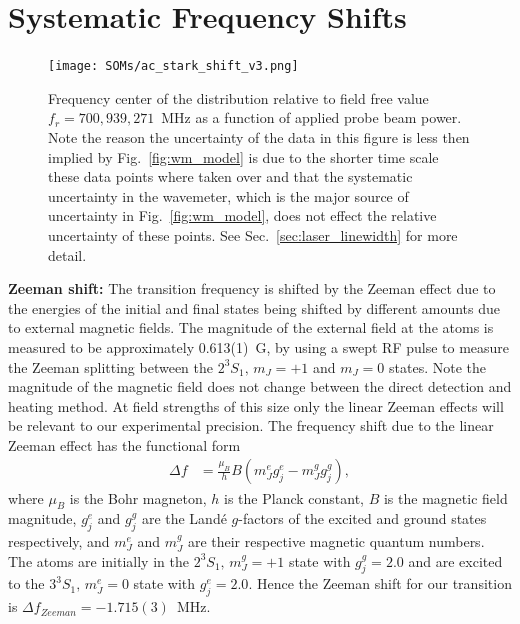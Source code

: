 \documentclass[%
 amsmath,amssymb,
aps,
]{revtex4-2}
\newcommand{\UpperState}{3^{3\!}S_1}%
\newcommand{\MetastableState}{2^{3\!}S_1}%
\begin{document}

\section{Systematic Frequency Shifts}
\label{sec:freq_shifts}
\begin{figure}
    \centering
    \texttt{[image: SOMs/ac\_stark\_shift\_v3.png]}
    \caption{Frequency center of the distribution relative to field free value \(f_r=700,939,271\)~MHz as a function of applied probe beam power. Note the reason the uncertainty of the data in this figure is less then implied by Fig.~\ref{fig:wm_model} is due to the shorter time scale these data points where taken over and that the systematic uncertainty in the wavemeter, which is the major source of uncertainty in Fig.~\ref{fig:wm_model}, does not effect the relative uncertainty of these points. See Sec.~\ref{sec:laser_linewidth} for more detail.}%
    \label{fig:ac_stark} %
\end{figure}
         \textbf{Zeeman shift:}
         The transition frequency is shifted by the Zeeman effect due to the energies of the initial and final states being shifted by different amounts due to external magnetic fields. The magnitude of the external field at the atoms is measured to be approximately 0.613(1)~G, by using a swept RF pulse to measure the Zeeman splitting between the \(\MetastableState, \,m_J=+1\) and \(m_J=0\) states. Note the magnitude of the magnetic field does not change between the direct detection and heating method. At field strengths of this size only the linear Zeeman effects will be relevant to our experimental precision. The frequency shift due to the linear Zeeman effect has the functional form 
         \begin{align}
             \Delta f &= \frac{\mu_B}{h} B (m_{J}^{e} g_{j}^{e} - m_{J}^{g} g_{j}^{g}),
         \end{align}
         where \(\mu_B\) is the Bohr magneton, \(h\) is the Planck constant, \(B\) is the magnetic field magnitude, \(g_{j}^{e}\) and \(g_{j}^{g}\) are the Land\'e \(g\)-factors of the excited and ground states respectively, and \(m_J^{e}\) and \(m_J^{g}\) are their respective magnetic quantum numbers. The atoms are initially in the \(\MetastableState, \, m_{J}^{g}=+1\) state with \(g_{j}^{g} = 2.0\) and are excited to the \(\UpperState, \, m_{J}^{e}=0\) state with \(g_{j}^{e} = 2.0\). Hence the Zeeman shift for our transition is \(\Delta f_{Zeeman} = - 1.715(3)\)~MHz.\\
         
\end{document}
